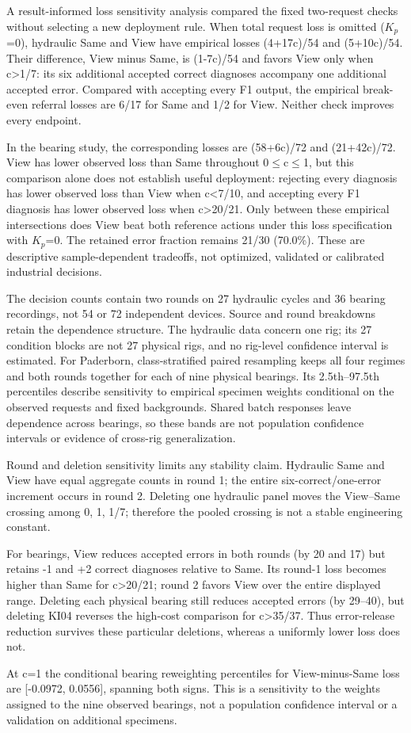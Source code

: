 A result-informed loss sensitivity analysis compared the fixed two-request checks without selecting a new deployment rule. When total request loss is omitted ($K_p$=0), hydraulic Same and View have empirical losses (4+17c)/54 and (5+10c)/54. Their difference, View minus Same, is (1-7c)/54 and favors View only when c>1/7: its six additional accepted correct diagnoses accompany one additional accepted error. Compared with accepting every F1 output, the empirical break-even referral losses are 6/17 for Same and 1/2 for View. Neither check improves every endpoint.

In the bearing study, the corresponding losses are (58+6c)/72 and (21+42c)/72. View has lower observed loss than Same throughout 0$\leq$c$\leq$1, but this comparison alone does not establish useful deployment: rejecting every diagnosis has lower observed loss than View when c<7/10, and accepting every F1 diagnosis has lower observed loss when c>20/21. Only between these empirical intersections does View beat both reference actions under this loss specification with $K_p$=0. The retained error fraction remains 21/30 (70.0\%). These are descriptive sample-dependent tradeoffs, not optimized, validated or calibrated industrial decisions.

The decision counts contain two rounds on 27 hydraulic cycles and 36 bearing recordings, not 54 or 72 independent devices. Source and round breakdowns retain the dependence structure. The hydraulic data concern one rig; its 27 condition blocks are not 27 physical rigs, and no rig-level confidence interval is estimated. For Paderborn, class-stratified paired resampling keeps all four regimes and both rounds together for each of nine physical bearings. Its 2.5th--97.5th percentiles describe sensitivity to empirical specimen weights conditional on the observed requests and fixed backgrounds. Shared batch responses leave dependence across bearings, so these bands are not population confidence intervals or evidence of cross-rig generalization.

Round and deletion sensitivity limits any stability claim. Hydraulic Same and View have equal aggregate counts in round 1; the entire six-correct/one-error increment occurs in round 2. Deleting one hydraulic panel moves the View--Same crossing among 0, 1, 1/7; therefore the pooled crossing is not a stable engineering constant.

For bearings, View reduces accepted errors in both rounds (by 20 and 17) but retains -1 and +2 correct diagnoses relative to Same. Its round-1 loss becomes higher than Same for c>20/21; round 2 favors View over the entire displayed range. Deleting each physical bearing still reduces accepted errors (by 29--40), but deleting KI04 reverses the high-cost comparison for c>35/37. Thus error-release reduction survives these particular deletions, whereas a uniformly lower loss does not.

At c=1 the conditional bearing reweighting percentiles for View-minus-Same loss are [-0.0972, 0.0556], spanning both signs. This is a sensitivity to the weights assigned to the nine observed bearings, not a population confidence interval or a validation on additional specimens.

